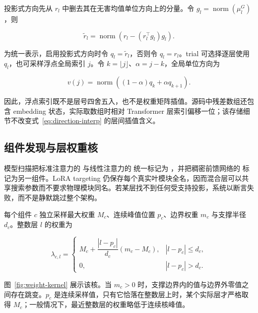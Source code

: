 投影式方向先从 $r_l$ 中删去其在无害均值单位方向上的分量。令 $g_l=\operatorname{norm}(\mu_l^G)$，则

\begin{equation}
\widetilde r_l=\operatorname{norm}\!\left(r_l-(r_l^{\top}g_l)g_l\right).
\label{eq:projected-direction}
\end{equation}

为统一表示，启用投影式方向时令 $q_l=\widetilde r_l$，否则令 $q_l=r_l$。trial 可选择逐层使用 $q_l$，也可采样浮点全局索引 $j$。令 $k=\lfloor j\rfloor$、$\alpha=j-k$，全局单位方向为

\begin{equation}
v(j)=\operatorname{norm}\!\left((1-\alpha)q_k+\alpha q_{k+1}\right).
\label{eq:direction-interp}
\end{equation}

因此，浮点索引既不是层号四舍五入，也不是权重矩阵插值。源码中残差数组还包含 embedding 状态，实际取数组时相对 Transformer 层索引偏移一位；该存储细节不改变式~\eqref{eq:direction-interp} 的层间插值含义。

\subsection{组件发现与层权重核}

模型扫描把标准注意力的  与线性注意力的  统一标记为 ，并把稠密前馈网络的  标记为另一组件。LoRA targeting 仍保存每个真实叶模块全名，因而混合层可以共享搜索参数而不要求物理模块同名。若某层找不到任何受支持投影，系统以断言失败，而不是静默跳过整个架构。

每个组件 $c$ 独立采样最大权重 $M_c$、连续峰值位置 $p_c$、边界权重 $m_c$ 与支撑半径 $d_c$。整数层 $l$ 的权重为

\begin{equation}
\lambda_{c,l}=\begin{cases}
M_c+\dfrac{|l-p_c|}{d_c}(m_c-M_c), & |l-p_c|\le d_c,\\[3pt]
0, & |l-p_c|>d_c.
\end{cases}
\label{eq:kernel}
\end{equation}

图~\ref{fig:weight-kernel} 展示该核。当 $m_c>0$ 时，支撑边界内的值与边界外零值之间存在跳变。$p_c$ 是连续采样值，只有它恰落在整数层上时，某个实际层才严格取得 $M_c$；一般情况下，最近整数层的权重略低于连续核峰值。



